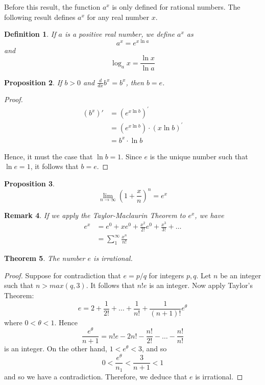 \documentclass[12pt]{article}
\theoremstyle{mystyle}
\newtheorem{thm}{Theorem}
\newtheorem{defn}[thm]{Definition}
\newtheorem{prop}[thm]{Proposition}
\newtheorem{remark}[thm]{Remark}
\begin{document}
Before this result, the function $a^x$ is only defined for rational numbers. The
following result defines $a^x$ for any real number $x$.
\begin{defn}
  If $a$ is a positive real number, we define $a^x$ as
  $$ a^x = e^{x \ln a} $$
  and
  $$ \log_a x = \frac{\ln x}{\ln a} $$
\end{defn}


\begin{prop}
  If $b > 0$ and $\frac{d}{dx} b^x = b^x$, then $b = e$.
\end{prop}
\begin{proof}
  \begin{align*}
    (b^x)' &= (e^{x \ln b})^\prime \\
           &= (e^{x \ln b}) \cdot (x \ln b)^\prime  \\
           &= b^x \cdot \ln b
  \end{align*}
  
  Hence, it must the case that $\ln b = 1$. Since $e$ is the unique number such
  that $\ln e = 1$, it follows that $b=e$.
\end{proof}


\begin{prop}
  $$ \lim_{n \to \infty} \left( 1 + \frac{x}{n} \right)^n = e^x $$
\end{prop}


\begin{remark}
  If we apply the Taylor-Maclaurin Theorem to $e^x$, we have
  \begin{align*}
    e^x &= e^0 + xe^0 + \frac{x^2}{2!}e^0 + \frac{x^3}{3!} +  \ldots \\
        &= \sum_1^\infty \frac{x^n}{n!}
  \end{align*}
\end{remark}

\begin{thm}
  The number $e$ is irrational. 
\end{thm}
\begin{proof}
  Suppose for contradiction that $e = p/q$ for integers $p,q$. Let $n$ be an
  integer such that $n > max(q,3)$. It follows that $n!e$ is an integer. Now
  apply Taylor's Theorem:
  $$ e = 2 + \frac{1}{2!} + \ldots + \frac{1}{n!} + \frac{1}{(n+1)!}e^\theta $$
  where $0 < \theta < 1$. Hence
  $$ \frac{e^\theta}{n+1} = n!e - 2n! - \frac{n!}{2!} - \ldots - \frac{n!}{n!} $$
  is an integer. On the other hand, $1 < e^\theta < 3$, and so 
  $$ 0< \frac{e^\theta}{n_1} < \frac{3}{n+1} < 1 $$
  and so we have a contradiction. Therefore, we deduce that $e$ is irrational.
  
\end{proof}
\end{document}
